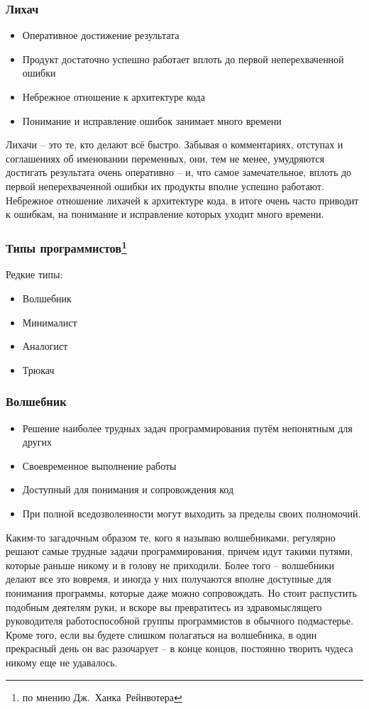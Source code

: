 \documentclass{../industrial-development}
\begin{document}
{\begin{frame} \frametitle{Лихач}
	 \begin{itemize}
		\item Оперативное достижение результата 
		\item Продукт достаточно успешно работает вплоть до первой неперехваченной ошибки
                     \item Небрежное отношение к архитектуре кода
		\item Понимание и исправление ошибок занимает много времени
		 
		\end{itemize}
\end{frame}
\lecturenotes
Лихачи – это те, кто делают всё быстро. Забывая о комментариях, отступах и соглашениях об именовании переменных, они, тем не менее, умудряются достигать результата очень оперативно – и, что самое замечательное, вплоть до первой неперехваченной ошибки их продукты вполне успешно работают. 
	 Небрежное отношение лихачей к архитектуре кода, в итоге очень часто приводит к ошибкам, на понимание и исправление которых уходит много времени.

\begin{frame} \frametitle{Типы программистов\footnote[1]{по мнению Дж.~Ханка~Рейнвотера}}
	\begin{block}{Редкие типы:}
\begin{itemize}
\item Волшебник
\item Минималист
\item Аналогист
\item Трюкач
\end{itemize}
\end{block}
\end{frame}
\lecturenotes

\begin{frame} \frametitle{Волшебник}
	\begin{itemize}
		\item Решение наиболее трудных задач программирования путём непонятным для других
		\item Своевременное выполнение работы
		\item Доступный для понимания и сопровождения код
		\item При полной вседозволенности могут выходить за пределы своих полномочий.
\end{itemize}
\end{frame}
\lecturenotes
Каким-то загадочным образом те, кого я называю волшебниками, регулярно решают самые трудные задачи программирования, причем идут такими путями, которые раньше никому и в голову не приходили. Более того – волшебники делают все это вовремя, и иногда у них получаются вполне доступные для понимания программы, которые даже можно сопровождать. 
Но стоит распустить подобным деятелям руки, и вскоре вы превратитесь из здравомыслящего руководителя работоспособной группы программистов в обычного подмастерье. Кроме того, если вы будете слишком полагаться на волшебника, в один прекрасный день он вас разочарует – в конце концов, постоянно творить чудеса никому еще не удавалось. 


}
\end{document}
